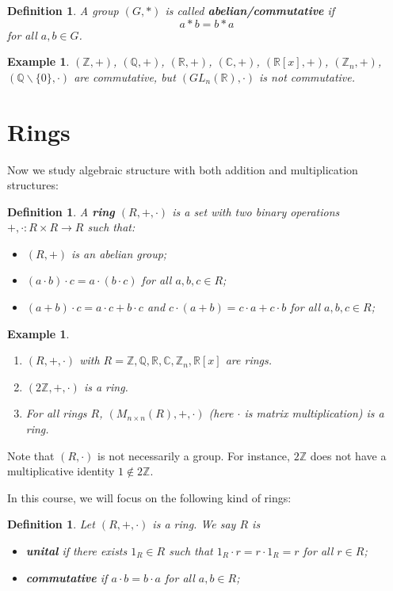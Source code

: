 \documentclass[12pt]{amsbook}
\newtheorem{definition}[theorem]{Definition}
\newtheorem{example}[theorem]{Example}
\begin{document}
\begin{definition}
    A group $(G, \ast)$ is called {\bf abelian/commutative} if
    $$a \ast b = b \ast a$$
    for all $a, b \in G$.
\end{definition}

\begin{example}
$(\mathbb{Z},+)$, $(\mathbb{Q},+)$, $(\mathbb{R},+)$, $(\mathbb{C},+)$, $(\mathbb{R}[x],+)$, $(\mathbb{Z}_n,+)$, $(\mathbb{Q}\backslash \{0\}, \cdot)$ are commutative, but $(GL_n(\mathbb{R}), \cdot)$ is not commutative.
\end{example}    

\section{Rings}
Now we study algebraic structure with both addition and multiplication structures:
\begin{definition}
    A {\bf ring} $(R,+,\cdot)$ is a set with two binary operations $+, \cdot: R \times R \to R$ such that:
    \begin{itemize}
        \item $(R,+)$ is an abelian group;
        \item $(a\cdot b) \cdot c = a \cdot (b \cdot c)$ for all $a, b, c \in R$;
        \item $(a+b)\cdot c = a\cdot c + b \cdot c$ and $c \cdot (a+b) = c\cdot a + c\cdot b$ for all $a, b, c \in R$;
    \end{itemize}
\end{definition}

\begin{example}
    \begin{enumerate}
        \item $(R,+,\cdot)$ with $R = \mathbb{Z}, \mathbb{Q}, \mathbb{R}, \mathbb{C}, \mathbb{Z}_n, \mathbb{R}[x]$ are rings.
        \item $(2\mathbb{Z},+,\cdot)$ is a ring.
        \item For all rings $R$, $(M_{n\times n}(R),+,\cdot)$ (here $\cdot$ is matrix multiplication) is a ring.
    \end{enumerate}
\end{example}

Note that $(R, \cdot)$ is not necessarily a group. For instance, $2\mathbb{Z}$ does not have a multiplicative identity $1 \notin 2\mathbb{Z}$. 

In this course, we will focus on the following kind of rings:
\begin{definition}
Let $(R,+,\cdot)$ is a ring. We say $R$ is 
\begin{itemize}
    \item {\bf unital} if there exists $1_R \in R$ such that $1_R\cdot r=r\cdot 1_R=r$ for all $r\in R$;
    \item {\bf commutative} if $a \cdot b = b \cdot a$ for all $a, b \in R$;
\end{itemize}
\end{definition}
\end{document}
